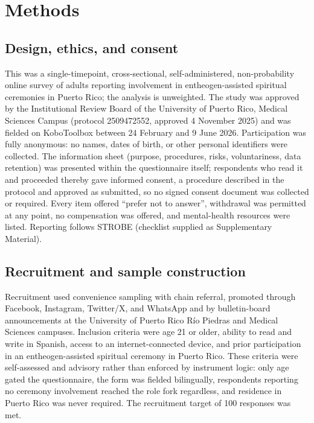 \documentclass[12pt]{article}
\begin{document}
\section{Methods}

\subsection{Design, ethics, and consent}

This was a single-timepoint, cross-sectional, self-administered, non-probability online survey of adults
reporting involvement in entheogen-assisted spiritual ceremonies in Puerto Rico; the analysis is unweighted.
The study was approved by the Institutional Review Board of the University of Puerto Rico, Medical Sciences
Campus (protocol 2509472552, approved 4 November 2025) and was fielded on KoboToolbox between 24 February
and 9 June 2026. Participation was fully anonymous: no names, dates of birth, or other personal identifiers
were collected. The information sheet (purpose, procedures, risks, voluntariness, data retention) was
presented within the questionnaire itself; respondents who read it and proceeded thereby gave informed
consent, a procedure described in the protocol and approved as submitted, so no signed consent document was
collected or required. Every item offered ``prefer not to answer'', withdrawal was permitted at any point,
no compensation was offered, and mental-health resources were listed. Reporting follows STROBE (checklist
supplied as Supplementary Material).

\subsection{Recruitment and sample construction}

Recruitment used convenience sampling with chain referral, promoted through Facebook, Instagram, Twitter/X,
and WhatsApp and by bulletin-board announcements at the University of Puerto Rico R\'io Piedras and Medical
Sciences campuses. Inclusion criteria were age 21 or older, ability to read and write in Spanish, access to
an internet-connected device, and prior participation in an entheogen-assisted spiritual ceremony in Puerto
Rico. These criteria were self-assessed and advisory rather than enforced by instrument logic: only age
gated the questionnaire, the form was fielded bilingually, respondents reporting no ceremony involvement
reached the role fork regardless, and residence in Puerto Rico was never required. The recruitment target
of 100 responses was met.
\end{document}
